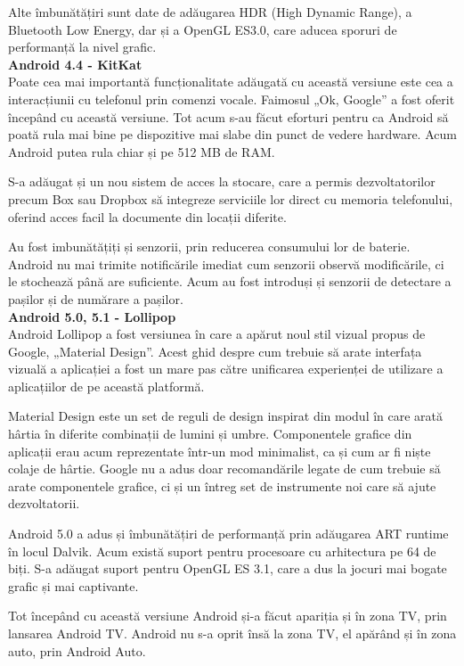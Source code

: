 \documentclass[12pt,a4paper]{article}
\begin{document}
	Alte îmbunătățiri sunt date de adăugarea HDR (High Dynamic Range), a Bluetooth Low Energy, dar și a OpenGL ES3.0, care aducea sporuri de performanță la nivel grafic.\\

\textbf{Android 4.4 - KitKat}\\
Poate cea mai importantă funcționalitate adăugată cu această versiune este cea a interacțiunii cu telefonul prin comenzi vocale. Faimosul „Ok, Google” a fost oferit începând cu această versiune. Tot acum s-au făcut eforturi pentru ca Android să poată rula mai bine pe dispozitive mai slabe din punct de vedere hardware. Acum Android putea rula chiar și pe 512 MB de RAM.

	S-a adăugat și un nou sistem de acces la stocare, care a permis dezvoltatorilor precum Box sau Dropbox să integreze serviciile lor direct cu memoria telefonului, oferind acces facil la documente din locații diferite.

	Au fost imbunătățiți și senzorii, prin reducerea consumului lor de baterie. Android nu  mai trimite notificările imediat cum senzorii observă modificările, ci le stochează până are suficiente.  Acum au fost introduși și senzorii de detectare a pașilor și de numărare a pașilor.\\
	
\textbf{Android 5.0, 5.1 - Lollipop}\\
Android Lollipop a fost versiunea în care a apărut noul stil vizual propus de Google, „Material Design”. Acest ghid despre cum trebuie să arate interfața vizuală a aplicației a fost un mare pas către unificarea experienței de utilizare a aplicațiilor de pe această platformă.
	
	Material Design este un set de reguli de design inspirat din modul în care arată hârtia în diferite combinații de lumini și umbre.
Componentele grafice din aplicații erau acum reprezentate într-un mod minimalist, ca și cum ar fi niște colaje de hârtie. Google nu a adus doar recomandările legate de cum trebuie să arate componentele grafice, ci și un întreg set de instrumente noi care să ajute dezvoltatorii.
	
	Android 5.0 a adus și îmbunătățiri de performanță prin adăugarea ART runtime în locul Dalvik. Acum există suport pentru procesoare cu arhitectura pe 64 de biți. S-a adăugat suport pentru OpenGL ES 3.1, care a dus la jocuri mai bogate grafic și mai captivante.
	
	Tot începând cu această versiune Android și-a făcut apariția și în zona TV, prin lansarea Android TV. Android nu s-a oprit însă la zona TV, el apărând și în zona auto, prin Android Auto.\\
\end{document}
